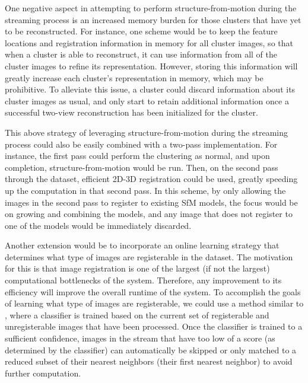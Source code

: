 One negative aspect in attempting to perform structure-from-motion during the streaming process is an increased memory burden for those clusters that have yet to be reconstructed.
For instance, one scheme would be to keep the feature locations and registration information in memory for all cluster images, so that when a cluster is able to reconstruct, it can use information from all of the cluster images to refine its representation.
However, storing this information will greatly increase each cluster's representation in memory, which may be prohibitive.
To alleviate this issue, a cluster could discard information about its cluster images as usual, and only start to retain additional information once a successful two-view reconstruction has been initialized for the cluster.

This above strategy of leveraging structure-from-motion during the streaming process could also be easily combined with a two-pass implementation.
For instance, the first pass could perform the clustering as normal, and upon completion, structure-from-motion would be run.
Then, on the second pass through the dataset, efficient 2D-3D registration could be used, greatly speeding up the computation in that second pass.
In this scheme, by only allowing the images in the second pass to register to existing SfM models, the focus would be on growing and combining the models, and any image that does not register to one of the models would be immediately discarded.

Another extension would be to incorporate an online learning strategy that determines what type of images are registerable in the dataset.
The motivation for this is that image registration is one of the largest (if not the largest) computational bottlenecks of the system.
Therefore, any improvement to its efficiency will improve the overall runtime of the system.
To accomplish the goals of learning what type of images are registerable, we could use a method similar to \cite{raguram2012_improved_verification}, where a classifier is trained based on the current set of registerable and unregisterable images that have been processed.
Once the classifier is trained to a sufficient confidence, images in the stream that have too low of a score (as determined by the classifier) can automatically be skipped or only matched to a reduced subset of their nearest neighbors (\ie their first nearest neighbor) to avoid further computation.

